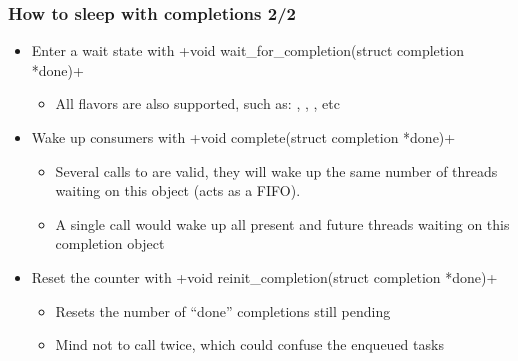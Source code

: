 \begin{frame}[fragile]
  \frametitle{How to sleep with completions 2/2}
  \begin{itemize}
  \item Enter a wait state with
    +void wait_for_completion(struct completion *done)+
    \begin{itemize}
    \item All  flavors are also supported, such as:
      ,
      ,
      , etc
    \end {itemize}
  \item Wake up consumers with
    +void complete(struct completion *done)+
    \begin{itemize}
    \item Several calls to  are valid, they will wake up
      the same number of threads waiting on this object (acts as a FIFO).
    \item A single  call would wake up all present and
      future threads waiting on this completion object
    \end {itemize}
  \item Reset the counter with
    +void reinit_completion(struct completion *done)+
    \begin{itemize}
    \item Resets the number of ``done'' completions still pending
    \item Mind not to call  twice, which could
      confuse the enqueued tasks
    \end{itemize}
  \end{itemize}
\end{frame}

